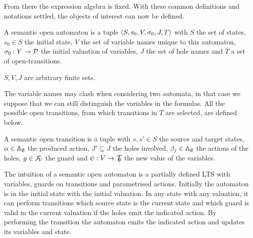 \documentclass{article}
\begin{document}
From there the expression algebra is fixed.
With these common definitions and notations settled, the objects of interest can now be defined.
\begin{defi}
A semantic open automaton is a tuple \(\OA{S}{s_0}{V}{\sigma_0}{J}{T}\) with \(S\) the set of states, \(s_0 \in S\) the initial state, \(V\) the set of variable names unique to this automaton, \(\sigma_0: V \to \values\) the initial valuation of variables, \(J\) the set of hole names and \(T\) a set of open-transitions.

\(S, V, J\) are arbitrary finite sets.
\end{defi}
The variable names may clash when considering two automata, in that case we suppose that we can still distinguish the variables in the formulas.
All the possible open transitions, from which transitions in \(T\) are selected, are defined below.
\begin{defi}
A semantic open transition is a tuple \nmm{\OTg} with \(s, s' \in S\) the source and target states, \(\alpha \in \ractions\) the produced action, \(J' \subseteq J\) the holes involved, \(\beta_j \in \ractions\) the actions of the holes, \(g \in \rformulae[V]\) the guard and \(\psi: V \to \rterms\) the new value of the variables.
\end{defi}
The intuition of a semantic open automaton is a partially defined LTS with variables, guards on transitions and parametrised actions.
Initially the automaton is in the initial state with the initial valuation.
In any state with any valuation, it can perform transitions which source state is the current state and which guard is valid in the current valuation if the holes emit the indicated action.
By performing the transition the automaton emits the indicated action and updates its variables and state.
\end{document}
